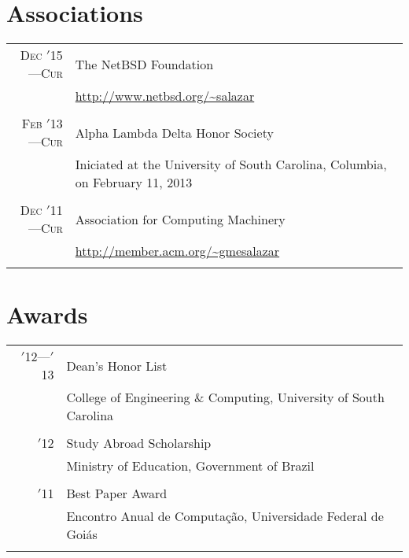 \documentclass[a4paper,10pt]{article}
\begin{document}
\section{Associations}

\begin{tabular}{r|p{11cm}}

  \textsc{Dec $'$15---Cur}
  & The NetBSD Foundation\\
  & \footnotesize{\url{http://www.netbsd.org/~salazar}}
  \\\multicolumn{2}{c}{}\\

  \textsc{Feb $'$13---Cur}
  & Alpha Lambda Delta Honor Society\\
  & \footnotesize{Iniciated at the University of South Carolina, Columbia, on February 11, 2013}\\
  \multicolumn{2}{c}{}\\

  \textsc{Dec $'$11---Cur}
  & Association for Computing Machinery\\
  & \footnotesize{\url{http://member.acm.org/~gmesalazar}}
  \\\multicolumn{2}{c}{}\\
  
\end{tabular}

\section{Awards}
\begin{tabular}{r|p{11cm}}

  \textsc{$'$12---$'$13}
  & Dean's Honor List\\
  & College of Engineering \& Computing, University of South Carolina\\
  \multicolumn{2}{c}{}\\

  \textsc{$'$12}
  & Study Abroad Scholarship\\
  & Ministry of Education, Government of Brazil\\
  \multicolumn{2}{c}{}\\

  \textsc{$'$11}
  & Best Paper Award\\
  & Encontro Anual de Computação, Universidade Federal de Goiás\\
  \multicolumn{2}{c}{}\\

\end{tabular}
\end{document}
